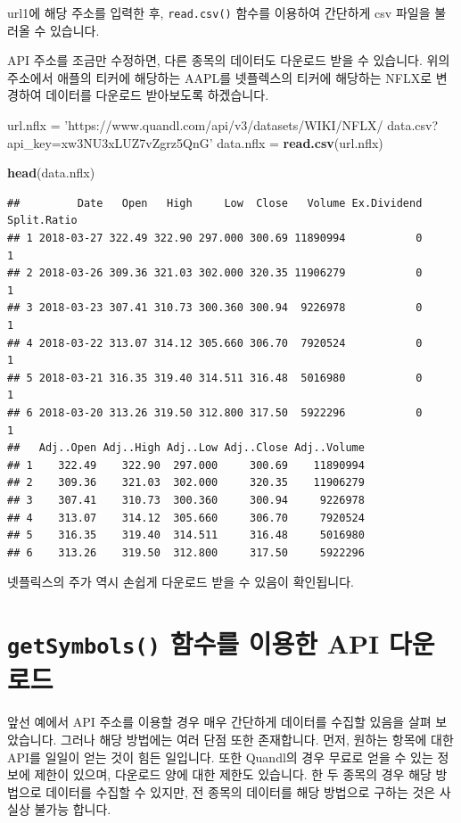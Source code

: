 \documentclass[]{book}
\newenvironment{Shaded}{\begin{snugshade}}{\end{snugshade}}
\newcommand{\KeywordTok}[1]{\textcolor[rgb]{0.13,0.29,0.53}{\textbf{#1}}}
\newcommand{\NormalTok}[1]{#1}
\newcommand{\StringTok}[1]{\textcolor[rgb]{0.31,0.60,0.02}{#1}}
\begin{document}
url1에 해당 주소를 입력한 후, \texttt{read.csv()} 함수를 이용하여 간단하게 csv 파일을 불러올 수 있습니다.

API 주소를 조금만 수정하면, 다른 종목의 데이터도 다운로드 받을 수 있습니다. 위의 주소에서 애플의 티커에 해당하는 AAPL를 넷플렉스의 티커에 해당하는 NFLX로 변경하여 데이터를 다운로드 받아보도록 하겠습니다.

\begin{Shaded}
\begin{Highlighting}[]
\NormalTok{url.nflx =}\StringTok{ 'https://www.quandl.com/api/v3/datasets/WIKI/NFLX/}
\StringTok{data.csv?api_key=xw3NU3xLUZ7vZgrz5QnG'}
\NormalTok{data.nflx =}\StringTok{ }\KeywordTok{read.csv}\NormalTok{(url.nflx)}

\KeywordTok{head}\NormalTok{(data.nflx)}
\end{Highlighting}
\end{Shaded}

\begin{verbatim}
##         Date   Open   High     Low  Close   Volume Ex.Dividend Split.Ratio
## 1 2018-03-27 322.49 322.90 297.000 300.69 11890994           0           1
## 2 2018-03-26 309.36 321.03 302.000 320.35 11906279           0           1
## 3 2018-03-23 307.41 310.73 300.360 300.94  9226978           0           1
## 4 2018-03-22 313.07 314.12 305.660 306.70  7920524           0           1
## 5 2018-03-21 316.35 319.40 314.511 316.48  5016980           0           1
## 6 2018-03-20 313.26 319.50 312.800 317.50  5922296           0           1
##   Adj..Open Adj..High Adj..Low Adj..Close Adj..Volume
## 1    322.49    322.90  297.000     300.69    11890994
## 2    309.36    321.03  302.000     320.35    11906279
## 3    307.41    310.73  300.360     300.94     9226978
## 4    313.07    314.12  305.660     306.70     7920524
## 5    316.35    319.40  314.511     316.48     5016980
## 6    313.26    319.50  312.800     317.50     5922296
\end{verbatim}

넷플릭스의 주가 역시 손쉽게 다운로드 받을 수 있음이 확인됩니다.

\hypertarget{getsymbols---api-}{%
\section{\texorpdfstring{\texttt{getSymbols()} 함수를 이용한 API 다운로드}{getSymbols() 함수를 이용한 API 다운로드}}\label{getsymbols---api-}}

앞선 예에서 API 주소를 이용할 경우 매우 간단하게 데이터를 수집할 있음을 살펴 보았습니다. 그러나 해당 방법에는 여러 단점 또한 존재합니다. 먼저, 원하는 항목에 대한 API를 일일이 얻는 것이 힘든 일입니다. 또한 Quandl의 경우 무료로 얻을 수 있는 정보에 제한이 있으며, 다운로드 양에 대한 제한도 있습니다. 한 두 종목의 경우 해당 방법으로 데이터를 수집할 수 있지만, 전 종목의 데이터를 해당 방법으로 구하는 것은 사실상 불가능 합니다.
\end{document}
